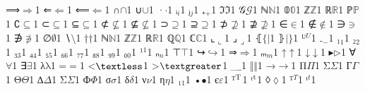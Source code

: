 {{{⟹}{{\ensuremath{\Longrightarrow}}}1
{⇐}{{\ensuremath{\Leftarrow}}}1
{⟸}{{\ensuremath{\Longleftarrow}}}1
{∩}{{\ensuremath{\cap}}}1
{∪}{{\ensuremath{\cup}}}1
{·}{{\ensuremath{\cdot}}}1
{ᵢ}{{\ensuremath{_i}}}1
{ⱼ}{{\ensuremath{_j}}}1
{₊}{{\ensuremath{_+}}}1
{ℑ}{{\ensuremath{\Im}}}1
{𝒢}{{\ensuremath{\mathcal{G}}}}1
{ℕ}{{\ensuremath{\mathbb{N}}}}1
{𝟘}{{\ensuremath{\mathbb{0}}}}1
{ℤ}{{\ensuremath{\mathbb{Z}}}}1
{ℝ}{{\ensuremath{\mathbb{R}}}}1
{ℙ}{{\ensuremath{\mathbb{P}}}}1
{∁}{{\ensuremath{\subseteq}}}1
{⊂}{{\ensuremath{\subseteq}}}1
{⊆}{{\ensuremath{\subseteq}}}1
{⊄}{{\ensuremath{\nsubseteq}}}1
{⊈}{{\ensuremath{\nsubseteq}}}1
{⊃}{{\ensuremath{\supseteq}}}1
{⊇}{{\ensuremath{\supseteq}}}1
{⊅}{{\ensuremath{\nsupseteq}}}1
{⊉}{{\ensuremath{\nsupseteq}}}1
{∈}{{\ensuremath{\in}}}1
{∉}{{\ensuremath{\notin}}}1
{∋}{{\ensuremath{\ni}}}1
{∌}{{\ensuremath{\notni}}}1
{∅}{{\ensuremath{\emptyset}}}1
{∖}{{\ensuremath{\setminus}}}1
{†}{{\ensuremath{\dag}}}1
{ℕ}{{\ensuremath{\mathbb{N}}}}1
{ℤ}{{\ensuremath{\mathbb{Z}}}}1
{ℝ}{{\ensuremath{\mathbb{R}}}}1
{ℚ}{{\ensuremath{\mathbb{Q}}}}1
{ℂ}{{\ensuremath{\mathbb{C}}}}1
{⌞}{{\ensuremath{\llcorner}}}1
{⌟}{{\ensuremath{\lrcorner}}}1
{⦃}{{\ensuremath{ \{\!| }}}1
{⦄}{{\ensuremath{ |\!\} }}}1
{ᵁ}{{\ensuremath{^U}}}1
{₋}{{\ensuremath{_{-}}}}1
{₁}{{\ensuremath{_1}}}1
{₂}{{\ensuremath{_2}}}1
{₃}{{\ensuremath{_3}}}1
{₄}{{\ensuremath{_4}}}1
{₅}{{\ensuremath{_5}}}1
{₆}{{\ensuremath{_6}}}1
{₇}{{\ensuremath{_7}}}1
{₈}{{\ensuremath{_8}}}1
{₉}{{\ensuremath{_9}}}1
{₀}{{\ensuremath{_0}}}1
{¹}{{\ensuremath{^1}}}1
{ₙ}{{\ensuremath{_n}}}1
{⊤}{{\ensuremath{\top}}}1
{↪}{{\ensuremath{\hookrightarrow}}}1
{⇒}{{\ensuremath{\Rightarrow}}}1
{ₘ}{{\ensuremath{_m}}}1
{↑}{{\ensuremath{\uparrow}}}1
{↓}{{\ensuremath{\downarrow}}}1
{▸}{{\ensuremath{\triangleright}}}1
{∀}{{\ensuremath{\forall}}}1
{∃}{{\ensuremath{\exists}}}1
{λ}{{\ensuremath{\mathrm{\lambda}}}}1
{=}{{\ensuremath{=}}}1
{<}{{\ensuremath{\textless}}}1
{>}{{\ensuremath{\textgreater}}}1
{_}{{$\_$}}1
{‖}{{\ensuremath{\Vert}}}1
{→}{{$\rightarrow$}}1
{Π}{{$\Pi$}}1
{Σ}{{$\Sigma$}}1
{Г}{{$\Gamma$}}1
{Θ}{{$\Theta$}}1
{∆}{{$\Delta$}}1
{Σ}{{$\Sigma$}}1
{Ф}{{$\Phi$}}1
{σ}{{$\sigma$}}1
{δ}{{$\delta$}}1
{ν}{{$\nu$}}1
{η}{{$\eta$}}1
{₁}{{$_1$}}1
{•}{{$\bullet$}}1
{є}{{$\varepsilon$}}1
{ᵀ}{{$\textsuperscript{T}$}}1
{ᵗ}{{$\textsuperscript{t}$}}1
{◊}{{$\lozenge$}}1
{ᵀ}{{$^T$}}1
{ᵗ}{{$^t$}}1
 }
}

\theoremstyle{definition}

\newtheorem{definition}{Definition}
\newtheorem{theorem}{Theorem}
\newtheorem{lemma}{Lemma}
\newtheorem{notation}{Notation}
\newtheorem{acknowledgment}{Acknowledgment}
\newtheorem{example}{Example}
\newtheorem{remark}{Remark}
\newtheorem{corollary}{Corollary}
\newtheorem{proposition}{Proposition}

